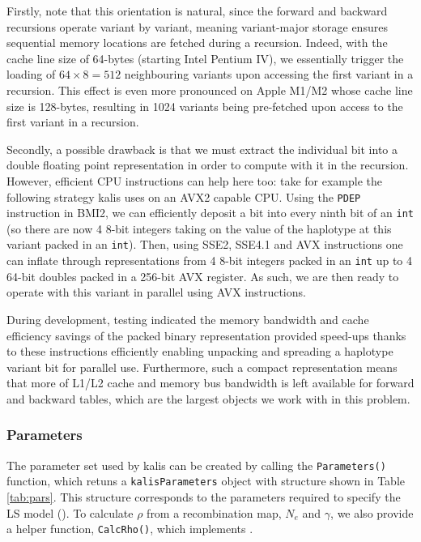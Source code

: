 \documentclass[pdflatex,referee,lineno,sn-nature]{sn-jnl}%
\newcommand{\pkg}[1]{{\fontseries{m}\fontseries{b}\selectfont #1}}
\begin{document}
Firstly, note that this orientation is natural, since the forward and backward recursions operate variant by variant, meaning variant-major storage ensures sequential memory locations are fetched during a recursion.
Indeed, with the cache line size of 64-bytes (starting Intel Pentium IV), we essentially trigger the loading of \(64 \times 8 = 512\) neighbouring variants upon accessing the first variant in a recursion.
This effect is even more pronounced on Apple M1/M2 whose cache line size is 128-bytes, resulting in 1024 variants being pre-fetched upon access to the first variant in a recursion.

Secondly, a possible drawback is that we must extract the individual bit into a double floating point representation in order to compute with it in the recursion.
However, efficient CPU instructions can help here too: take for example the following strategy \pkg{kalis} uses on an AVX2 capable CPU.
Using the \texttt{PDEP} instruction in BMI2, we can efficiently deposit a bit into every ninth bit of an \texttt{int} (so there are now 4 8-bit integers taking on the value of the haplotype at this variant packed in an \texttt{int}).
Then, using SSE2, SSE4.1 and AVX instructions one can inflate through representations from 4 8-bit integers packed in an \texttt{int} up to 4 64-bit doubles packed in a 256-bit AVX register.
As such, we are then ready to operate with this variant in parallel using AVX instructions.

During development, testing indicated the memory bandwidth and cache efficiency savings of the packed binary representation provided speed-ups thanks to these instructions efficiently enabling unpacking and spreading a haplotype variant bit for parallel use.
Furthermore, such a compact representation means that more of L1/L2 cache and memory bus bandwidth is left available for forward and backward tables, which are the largest objects we work with in this problem.



\subsubsection*{Parameters}
\label{parameters}

The parameter set used by \pkg{kalis} can be created by calling the \texttt{Parameters()} function, which retuns a \texttt{kalisParameters} object with structure shown in Table \ref{tab:pars}.
This structure corresponds to the parameters required to specify the LS model ().
To calculate $\rho$ from a recombination map, $N_e$ and $\gamma$, we also provide a helper function, \texttt{CalcRho()}, which implements .
\end{document}

